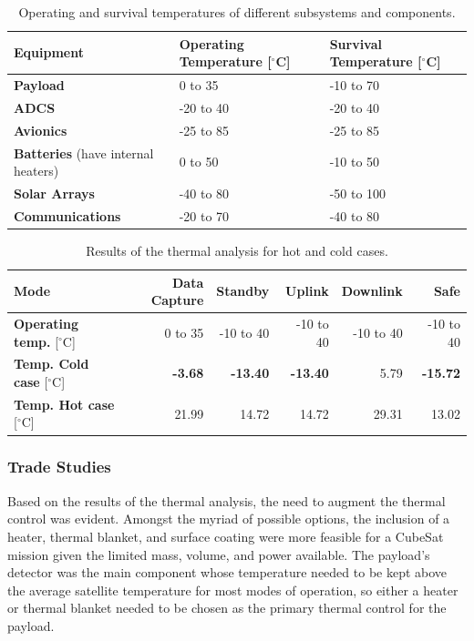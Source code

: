 \documentclass[12pt]{article}
\begin{document}
\begin{table}[ht]%
\caption{Operating and survival temperatures of different subsystems and components.}
\label{table:thermal-inputs}
\begin{tabular}{|p{1.5in}|l|l|}\hline
\textbf{Equipment} & \textbf{Operating Temperature} [$^\circ$C] & \textbf{Survival Temperature} [$^\circ$C] \\\hline
\textbf{Payload} & 0 to 35 & -10 to 70 \\\hline
\textbf{ADCS} & -20 to 40 & -20 to 40 \\\hline
\textbf{Avionics} & -25 to 85 & -25 to 85\\\hline
\textbf{Batteries} (have internal heaters) & 0 to 50 & -10 to 50\\\hline
\textbf{Solar Arrays} & -40 to 80  & -50 to 100 \\\hline
\textbf{Communications} & -20 to 70 & -40 to 80 \\\hline
\end{tabular}
\end{table}

\begin{table}[ht]%
\caption{Results of the thermal analysis for hot and cold cases.}
\label{table:thermal-results}
\begin{tabular}{|l|r|r|r|r|r|}\hline
\textbf{Mode} & \textbf{Data Capture} & \textbf{Standby} & \textbf{Uplink} & \textbf{Downlink} & \textbf{Safe} \\\hline
\textbf{Operating temp.} [$^\circ$C] & 0 to 35 & -10 to 40 & -10 to 40 & -10 to 40 & -10 to 40 \\\hline
\textbf{Temp. Cold case} [$^\circ$C] & \textbf{-3.68} & \textbf{-13.40} & \textbf{-13.40} & 5.79 & \textbf{-15.72} \\\hline
\textbf{Temp. Hot case} [$^\circ$C] & 21.99 & 14.72 & 14.72 & 29.31 & 13.02 \\\hline
\end{tabular}
\end{table}

\subsubsection{Trade Studies}

Based on the results of the thermal analysis, the need to augment the thermal control was evident. Amongst the myriad of possible options, the inclusion of a heater, thermal blanket, and surface coating were more feasible for a CubeSat mission given the limited mass, volume, and power available. The payload’s detector was the main component whose temperature needed to be kept above the average satellite temperature for most modes of operation, so either a heater or thermal blanket needed to be chosen as the primary thermal control for the payload.
\end{document}
